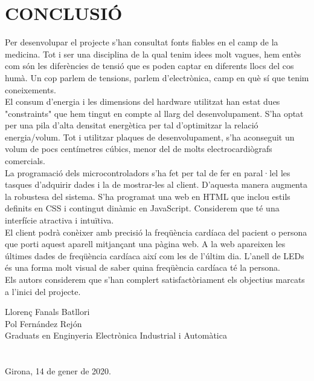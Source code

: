 \chapter{\uppercase{Conclusió}}
Per desenvolupar el projecte s'han consultat fonts fiables en el camp de la medicina. Tot i ser una disciplina de la qual tenim idees molt vagues, hem entès com són les diferències de tensió que es poden captar en diferents llocs del cos humà. Un cop parlem de tensions, parlem d'electrònica, camp en què sí que tenim coneixements.\\
\newline El consum d'energia i les dimensions del hardware utilitzat han estat dues "constraints" que hem tingut en compte al llarg del desenvolupament. S'ha optat per una pila d'alta densitat energètica per tal d'optimitzar la relació energia/volum. Tot i utilitzar plaques de desenvolupament, s'ha aconseguit un volum de pocs centímetres cúbics, menor del de molts electrocardiògrafs comercials.\\
\newline La programació dels microcontroladors s'ha fet per tal de fer en paral·lel les tasques d'adquirir dades i la de mostrar-les al client. D'aquesta manera augmenta la robustesa del sistema. S'ha programat una web en HTML que inclou estils definits en CSS i contingut dinàmic en JavaScript. Considerem que té una interfície atractiva i intuïtiva.\\
\newline El client podrà conèixer amb precisió la freqüència cardíaca del pacient o persona que porti aquest aparell mitjançant una pàgina web. A la web apareixen les últimes dades de freqüència cardíaca així com les de l'últim dia. L'anell de LEDs és una forma molt visual de saber quina freqüència cardíaca té la persona.\\
\newline Els autors considerem que s'han complert satisfactòriament els objectius marcats a l'inici del projecte.

\vspace*{\fill}
\noindent Llorenç Fanals Batllori\\
Pol Fernández Rejón\\
Graduats en Enginyeria Electrònica Industrial i Automàtica\\
\\
\\
Girona, 14 de gener de 2020.

\clearpage